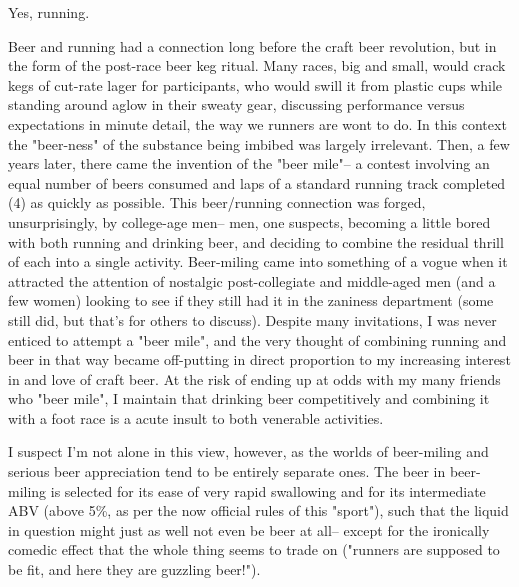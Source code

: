 \bigskip
Yes, running.
\bigskip

Beer and running had a connection long before the craft beer revolution, but in the form of the post-race beer keg ritual. Many races, big and small, would crack kegs of cut-rate lager for participants, who would swill it from plastic cups while standing around aglow in their sweaty gear, discussing performance versus expectations in minute detail, the way we runners are wont to do. In this context the "beer-ness" of the substance being imbibed was largely irrelevant. Then, a few years later, there came the invention of the "beer mile"-- a contest involving an equal number of beers consumed and laps of a standard running track completed (4) as quickly as possible. This beer/running connection was forged, unsurprisingly, by college-age men-- men, one suspects, becoming a little bored with both running and drinking beer, and deciding to combine the residual thrill of each into a single activity. Beer-miling came into something of a vogue when it attracted the attention of nostalgic post-collegiate and middle-aged men (and a few women) looking to see if they still had it in the zaniness department (some still did, but that's for others to discuss). Despite many invitations, I was never enticed to attempt a "beer mile", and the very thought of combining running and beer in that way became off-putting in direct proportion to my increasing interest in and love of craft beer. At the risk of ending up at odds with my many friends who "beer mile", I maintain that drinking beer competitively and combining it with a foot race is a acute insult to both venerable activities.

I suspect I'm not alone in this view, however, as the worlds of beer-miling and serious beer appreciation tend to be entirely separate ones. The beer in beer-miling is selected for its ease of very rapid swallowing and for its intermediate ABV (above 5\%, as per the now official rules of this "sport"), such that the liquid in question might just as well not even be beer at all-- except for the ironically comedic effect that the whole thing seems to trade on ("runners are supposed to be fit, and here they are guzzling beer!").

